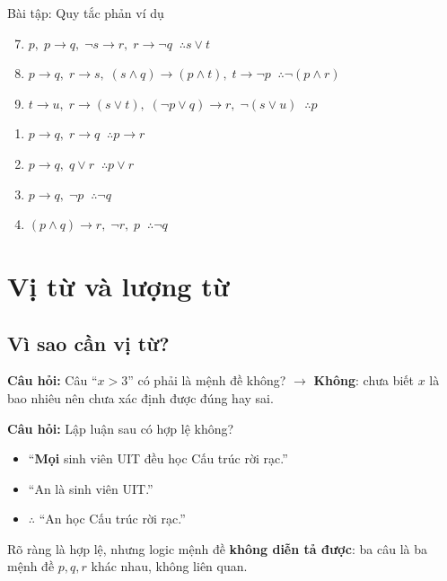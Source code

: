 \documentclass[12pt,a4paper]{article}
\begin{document}
\begin{baitap}{Bài tập: Quy tắc phản ví dụ}
\noindent
\begin{minipage}[t]{0.64\textwidth}
\begin{enumerate}[label=\textbf{\alph*)}, leftmargin=1.2em]
  \setcounter{enumi}{6}
  \item $p,\; p \to q,\; \neg s \to r,\; r \to \neg q\;\; \therefore s \lor t$
  \item $p \to q,\; r \to s,\; (s \land q) \to (p \land t),\; t \to \neg p\;\; \therefore \neg(p \land r)$
  \item $t \to u,\; r \to (s \lor t),\; (\neg p \lor q) \to r,\; \neg(s \lor u)\;\; \therefore p$
\end{enumerate}
\end{minipage}
\hfill
\begin{minipage}[t]{0.34\textwidth}
\begin{enumerate}[label=\textbf{\arabic*)}, leftmargin=1.2em]
  \item $p \to q,\; r \to q\;\; \therefore p \to r$
  \item $p \to q,\; q \lor r\;\; \therefore p \lor r$
  \item $p \to q,\; \neg p\;\; \therefore \neg q$
  \item $(p \land q) \to r,\; \neg r,\; p\;\; \therefore \neg q$
\end{enumerate}
\end{minipage}
\end{baitap}

\section{Vị từ và lượng từ}

\subsection{Vì sao cần vị từ?}

\textbf{Câu hỏi:} Câu ``$x > 3$'' có phải là mệnh đề không? $\rightarrow$ \textbf{Không}: chưa biết $x$ là bao nhiêu nên chưa xác định được đúng hay sai.

\textbf{Câu hỏi:} Lập luận sau có hợp lệ không?
\begin{itemize}
  \item ``\textbf{Mọi} sinh viên UIT đều học Cấu trúc rời rạc.''
  \item ``An là sinh viên UIT.''
  \item $\therefore$ ``An học Cấu trúc rời rạc.''
\end{itemize}
Rõ ràng là hợp lệ, nhưng logic mệnh đề \textbf{không diễn tả được}: ba câu là ba mệnh đề $p, q, r$ khác nhau, không liên quan.
\end{document}

